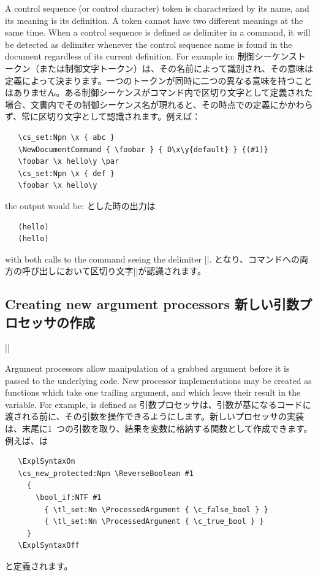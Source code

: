 \documentclass{ltxguide}
\newcommand\jpnewline{\vspace{3pt}\newline}
\begin{document}
A control sequence (or control character) token is characterized by
its name, and its meaning is its definition.
A token cannot have two different meanings at the same time.
When a control sequence is defined as delimiter in a command,
it will be detected as delimiter whenever the control sequence name
is found in the document regardless of its current definition.
For example in:
\jpnewline
制御シーケンストークン（または制御文字トークン）は、その名前によって識別され、その意味は定義によって決まります。一つのトークンが同時に二つの異なる意味を持つことはありません。ある制御シーケンスがコマンド内で区切り文字として定義された場合、文書内でその制御シーケンス名が現れると、その時点での定義にかかわらず、常に区切り文字として認識されます。例えば：
\begin{verbatim}
   \cs_set:Npn \x { abc }
   \NewDocumentCommand { \foobar } { D\x\y{default} } {(#1)}
   \foobar \x hello\y \par
   \cs_set:Npn \x { def }
   \foobar \x hello\y
\end{verbatim}
the output would be:
\jpnewline
とした時の出力は
\begin{verbatim}
   (hello)
   (hello)
\end{verbatim}
with both calls to the command seeing the delimiter |\x|.
\jpnewline
となり、コマンドへの両方の呼び出しにおいて区切り文字|\x|が認識されます。

\subsection{Creating new argument processors
新しい引数プロセッサの作成}

\begin{decl}
  |\ProcessedArgument|
\end{decl}
Argument processors allow manipulation of a grabbed argument before it is
passed to the underlying code. New processor implementations may be created
as functions which take one trailing argument, and which leave their result in
the  variable. For example,  is
defined as
\jpnewline
引数プロセッサは、引数が基になるコードに渡される前に、その引数を操作できるようにします。新しいプロセッサの実装は、末尾に1~つの引数を取り、結果を変数に格納する関数として作成できます。例えば、は
\begin{verbatim}
   \ExplSyntaxOn
   \cs_new_protected:Npn \ReverseBoolean #1
     {
       \bool_if:NTF #1
         { \tl_set:Nn \ProcessedArgument { \c_false_bool } }
         { \tl_set:Nn \ProcessedArgument { \c_true_bool } }
     }
   \ExplSyntaxOff
\end{verbatim}
と定義されます。
\end{document}
